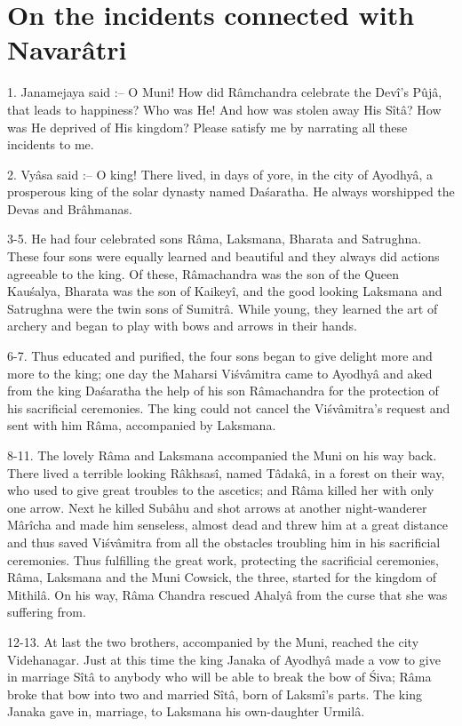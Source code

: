 ﻿\chapter{On the incidents connected with Navar\^atri}

1. Janamejaya said :-- O Muni! How did R\^amchandra celebrate the Dev\^i's Pûj\^a, that leads to happiness? Who was He! And how was stolen away His S\^it\^a? How was He deprived of His kingdom? Please satisfy me by narrating all these incidents to me.

2. Vy\^asa said :-- O king! There lived, in days of yore, in the city of Ayodhy\^a, a prosperous king of the solar dynasty named Da\'saratha. He always worshipped the Devas and Br\^ahmanas.

3-5. He had four celebrated sons R\^ama, Laksmana, Bharata and Satrughna. These four sons were equally learned and beautiful and they always did actions agreeable to the king. Of these, R\^amachandra was the son of the Queen Kau\'salya, Bharata was the son of Kaikey\^i, and the good looking Laksmana and Satrughna were the twin sons of Sumitr\^a. While young, they learned the art of archery and began to play with bows and arrows in their hands.

6-7. Thus educated and purified, the four sons began to give delight more and more to the king; one day the Maharsi Vi\'sv\^amitra came to Ayodhy\^a and aked from the king Da\'saratha the help of his son R\^amachandra for the protection of his sacrificial ceremonies. The king could not cancel the Vi\'sv\^amitra's request and sent with him R\^ama, accompanied by Laksmana.

8-11. The lovely R\^ama and Laksmana accompanied the Muni on his way back. There lived a terrible looking R\^akhsas\^i, named T\^adak\^a, in a forest on their way, who used to give great troubles to the ascetics; and R\^ama killed her with only one arrow. Next he killed Sub\^ahu and shot arrows at another night-wanderer M\^ar\^icha and made him senseless, almost dead and threw him at a great distance and thus saved Vi\'sv\^amitra from all the obstacles troubling him in his sacrificial ceremonies. Thus fulfilling the great work, protecting the sacrificial ceremonies, R\^ama, Laksmana and the Muni Cowsick, the three, started for the kingdom of Mithil\^a. On his way, R\^ama Chandra rescued Ahaly\^a from the curse that she was suffering from.

12-13. At last the two brothers, accompanied by the Muni, reached the city Videhanagar. Just at this time the king Janaka of Ayodhy\^a made a vow to give in marriage S\^it\^a to anybody who will be able to break the bow of \'Siva; R\^ama broke that bow into two and married S\^it\^a, born of Laksm\^i's parts. The king Janaka gave in, marriage, to Laksmana his own-daughter Urmil\^a.


